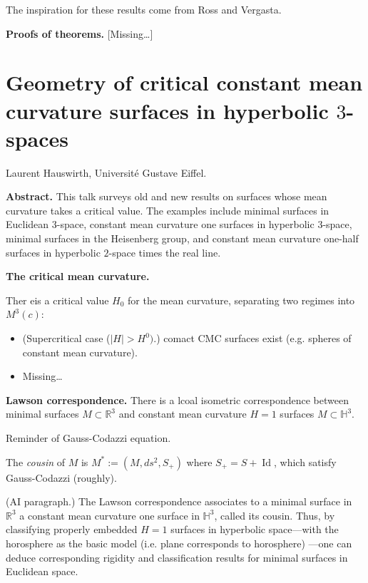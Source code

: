 \noindent
The inspiration for these results
come from Ross and Vergasta.

\medskip\noindent
{\bf Proofs of theorems.}
[Missing…]




\section{Geometry of critical constant
mean curvature surfaces in hyperbolic
$3$-spaces}
\label{section-critical-cmc-hyperbolic}

\medskip\noindent
Laurent Hauswirth,
Universit\'e Gustave Eiffel.

\medskip\noindent
{\bf Abstract.}
This talk surveys old and new results on
surfaces whose mean curvature takes a
critical value. The examples include
minimal surfaces in Euclidean $3$-space,
constant mean curvature one surfaces in
hyperbolic $3$-space, minimal surfaces in
the Heisenberg group, and constant mean
curvature one-half surfaces in
hyperbolic $2$-space times the real line.

\medskip\noindent
{\bf The critical mean curvature.}

Ther eis a critical value $H_0$ for
the mean curvature, separating two regimes
into $M^3(c)$:
\begin{itemize}
\item (Supercritical case ($|H|>H^0)$.)
comact CMC surfaces exist (e.g. spheres
of constant mean curvature).
\item Missing…
\end{itemize}

\medskip\noindent
{\bf Lawson correspondence.}
There is a lcoal isometric correspondence
between minimal surfaces $M \subset
\mathbb{R}^3$ and constant mean curvature
$H=1 $ surfaces $M \subset \mathbb{H}^3$.

Reminder of Gauss-Codazzi equation.

The {\it cousin} of $M$ is $M^*:=
(M, ds^2, S_+)$ where $S_+=
S+\operatorname{Id}$,
which satisfy Gauss-Codazzi (roughly).

(AI paragraph.)
The Lawson correspondence associates to a
minimal surface in $\mathbb{R}^3$ a
constant mean curvature one surface in
$\mathbb{H}^3$, called its cousin. Thus,
by classifying properly embedded $H=1$
surfaces in hyperbolic space---with the
horosphere as the basic model
(i.e. plane corresponds to horosphere)
---one can
deduce corresponding rigidity and
classification results for minimal
surfaces in Euclidean space.

